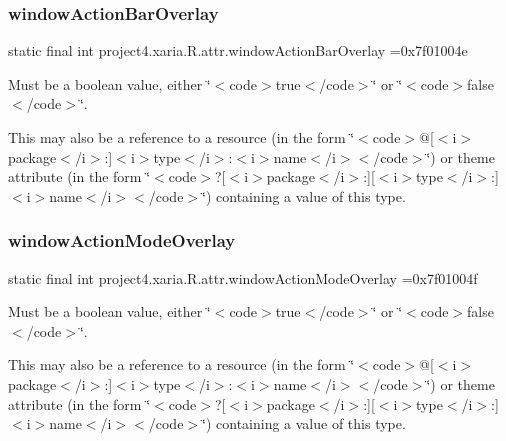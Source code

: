 \subsubsection{\texorpdfstring{window\+Action\+Bar\+Overlay}{windowActionBarOverlay}}
{\footnotesize\ttfamily static final int project4.\+xaria.\+R.\+attr.\+window\+Action\+Bar\+Overlay =0x7f01004e\hspace{0.3cm}{\ttfamily [static]}}

Must be a boolean value, either \char`\"{}$<$code$>$true$<$/code$>$\char`\"{} or \char`\"{}$<$code$>$false$<$/code$>$\char`\"{}. 

This may also be a reference to a resource (in the form \char`\"{}$<$code$>$@\mbox{[}$<$i$>$package$<$/i$>$\+:\mbox{]}$<$i$>$type$<$/i$>$\+:$<$i$>$name$<$/i$>$$<$/code$>$\char`\"{}) or theme attribute (in the form \char`\"{}$<$code$>$?\mbox{[}$<$i$>$package$<$/i$>$\+:\mbox{]}\mbox{[}$<$i$>$type$<$/i$>$\+:\mbox{]}$<$i$>$name$<$/i$>$$<$/code$>$\char`\"{}) containing a value of this type. \mbox{\label{classproject4_1_1xaria_1_1R_1_1attr_a60013c3426d8e626e5a8d80f7ec529b4}} 
\subsubsection{\texorpdfstring{window\+Action\+Mode\+Overlay}{windowActionModeOverlay}}
{\footnotesize\ttfamily static final int project4.\+xaria.\+R.\+attr.\+window\+Action\+Mode\+Overlay =0x7f01004f\hspace{0.3cm}{\ttfamily [static]}}

Must be a boolean value, either \char`\"{}$<$code$>$true$<$/code$>$\char`\"{} or \char`\"{}$<$code$>$false$<$/code$>$\char`\"{}. 

This may also be a reference to a resource (in the form \char`\"{}$<$code$>$@\mbox{[}$<$i$>$package$<$/i$>$\+:\mbox{]}$<$i$>$type$<$/i$>$\+:$<$i$>$name$<$/i$>$$<$/code$>$\char`\"{}) or theme attribute (in the form \char`\"{}$<$code$>$?\mbox{[}$<$i$>$package$<$/i$>$\+:\mbox{]}\mbox{[}$<$i$>$type$<$/i$>$\+:\mbox{]}$<$i$>$name$<$/i$>$$<$/code$>$\char`\"{}) containing a value of this type. \mbox{\label{classproject4_1_1xaria_1_1R_1_1attr_a94fc7fa359ad89e25f08eed9b0de79e1}} 
